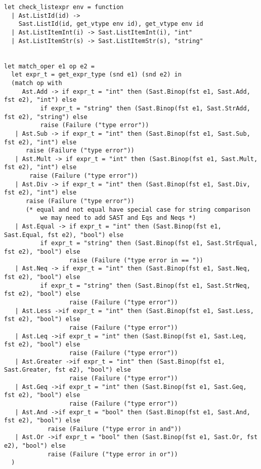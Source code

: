 \documentclass[11pt]{article}
\begin{document}
\begin{listing}[H]
  \begin{verbatim}
let check_listexpr env = function
  | Ast.ListId(id) ->
    Sast.ListId(id, get_vtype env id), get_vtype env id
  | Ast.ListItemInt(i) -> Sast.ListItemInt(i), "int"
  | Ast.ListItemStr(s) -> Sast.ListItemStr(s), "string"


let match_oper e1 op e2 =
  let expr_t = get_expr_type (snd e1) (snd e2) in
  (match op with
     Ast.Add -> if expr_t = "int" then (Sast.Binop(fst e1, Sast.Add, fst e2), "int") else
          if expr_t = "string" then (Sast.Binop(fst e1, Sast.StrAdd, fst e2), "string") else
          raise (Failure ("type error"))
   | Ast.Sub -> if expr_t = "int" then (Sast.Binop(fst e1, Sast.Sub, fst e2), "int") else
      raise (Failure ("type error"))
   | Ast.Mult -> if expr_t = "int" then (Sast.Binop(fst e1, Sast.Mult, fst e2), "int") else
       raise (Failure ("type error"))
   | Ast.Div -> if expr_t = "int" then (Sast.Binop(fst e1, Sast.Div, fst e2), "int") else
      raise (Failure ("type error"))
      (* equal and not equal have special case for string comparison
          we may need to add SAST and Eqs and Neqs *)
   | Ast.Equal -> if expr_t = "int" then (Sast.Binop(fst e1, Sast.Equal, fst e2), "bool") else
          if expr_t = "string" then (Sast.Binop(fst e1, Sast.StrEqual, fst e2), "bool") else
                  raise (Failure ("type error in == "))
   | Ast.Neq -> if expr_t = "int" then (Sast.Binop(fst e1, Sast.Neq, fst e2), "bool") else
          if expr_t = "string" then (Sast.Binop(fst e1, Sast.StrNeq, fst e2), "bool") else
                  raise (Failure ("type error"))
   | Ast.Less ->if expr_t = "int" then (Sast.Binop(fst e1, Sast.Less, fst e2), "bool") else
                  raise (Failure ("type error"))
   | Ast.Leq ->if expr_t = "int" then (Sast.Binop(fst e1, Sast.Leq, fst e2), "bool") else
                  raise (Failure ("type error"))
   | Ast.Greater ->if expr_t = "int" then (Sast.Binop(fst e1, Sast.Greater, fst e2), "bool") else
                  raise (Failure ("type error"))
   | Ast.Geq ->if expr_t = "int" then (Sast.Binop(fst e1, Sast.Geq, fst e2), "bool") else
                  raise (Failure ("type error"))
   | Ast.And ->if expr_t = "bool" then (Sast.Binop(fst e1, Sast.And, fst e2), "bool") else
            raise (Failure ("type error in and"))
   | Ast.Or ->if expr_t = "bool" then (Sast.Binop(fst e1, Sast.Or, fst e2), "bool") else
            raise (Failure ("type error in or"))
  )
  \end{verbatim}
\end{listing}
\end{document}
